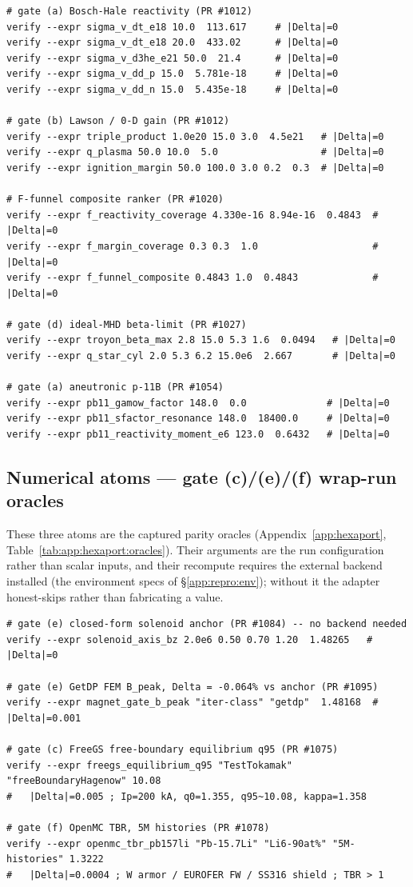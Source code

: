 \begin{lstlisting}
# gate (a) Bosch-Hale reactivity (PR #1012)
verify --expr sigma_v_dt_e18 10.0  113.617     # |Delta|=0
verify --expr sigma_v_dt_e18 20.0  433.02      # |Delta|=0
verify --expr sigma_v_d3he_e21 50.0  21.4      # |Delta|=0
verify --expr sigma_v_dd_p 15.0  5.781e-18     # |Delta|=0
verify --expr sigma_v_dd_n 15.0  5.435e-18     # |Delta|=0

# gate (b) Lawson / 0-D gain (PR #1012)
verify --expr triple_product 1.0e20 15.0 3.0  4.5e21   # |Delta|=0
verify --expr q_plasma 50.0 10.0  5.0                  # |Delta|=0
verify --expr ignition_margin 50.0 100.0 3.0 0.2  0.3  # |Delta|=0

# F-funnel composite ranker (PR #1020)
verify --expr f_reactivity_coverage 4.330e-16 8.94e-16  0.4843  # |Delta|=0
verify --expr f_margin_coverage 0.3 0.3  1.0                    # |Delta|=0
verify --expr f_funnel_composite 0.4843 1.0  0.4843             # |Delta|=0

# gate (d) ideal-MHD beta-limit (PR #1027)
verify --expr troyon_beta_max 2.8 15.0 5.3 1.6  0.0494   # |Delta|=0
verify --expr q_star_cyl 2.0 5.3 6.2 15.0e6  2.667       # |Delta|=0

# gate (a) aneutronic p-11B (PR #1054)
verify --expr pb11_gamow_factor 148.0  0.0              # |Delta|=0
verify --expr pb11_sfactor_resonance 148.0  18400.0     # |Delta|=0
verify --expr pb11_reactivity_moment_e6 123.0  0.6432   # |Delta|=0
\end{lstlisting}

\subsection{Numerical atoms --- gate (c)/(e)/(f) wrap-run oracles}
\label{app:repro:oracles}

These three atoms are the captured parity oracles
(Appendix~\ref{app:hexaport}, Table~\ref{tab:app:hexaport:oracles}).
Their arguments are the run configuration rather than scalar inputs,
and their recompute requires the external backend installed (the
environment specs of \S\ref{app:repro:env}); without it the adapter
honest-skips rather than fabricating a value.

\begin{lstlisting}
# gate (e) closed-form solenoid anchor (PR #1084) -- no backend needed
verify --expr solenoid_axis_bz 2.0e6 0.50 0.70 1.20  1.48265   # |Delta|=0

# gate (e) GetDP FEM B_peak, Delta = -0.064% vs anchor (PR #1095)
verify --expr magnet_gate_b_peak "iter-class" "getdp"  1.48168  # |Delta|=0.001

# gate (c) FreeGS free-boundary equilibrium q95 (PR #1075)
verify --expr freegs_equilibrium_q95 "TestTokamak" "freeBoundaryHagenow" 10.08
#   |Delta|=0.005 ; Ip=200 kA, q0=1.355, q95~10.08, kappa=1.358

# gate (f) OpenMC TBR, 5M histories (PR #1078)
verify --expr openmc_tbr_pb157li "Pb-15.7Li" "Li6-90at%" "5M-histories" 1.3222
#   |Delta|=0.0004 ; W armor / EUROFER FW / SS316 shield ; TBR > 1
\end{lstlisting}

